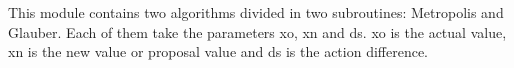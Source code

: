This module contains two algorithms divided in two subroutines: Metropolis and Glauber. Each of them take the parameters xo, xn and ds. xo is the actual value, xn is the new value or proposal value and ds is the action difference.